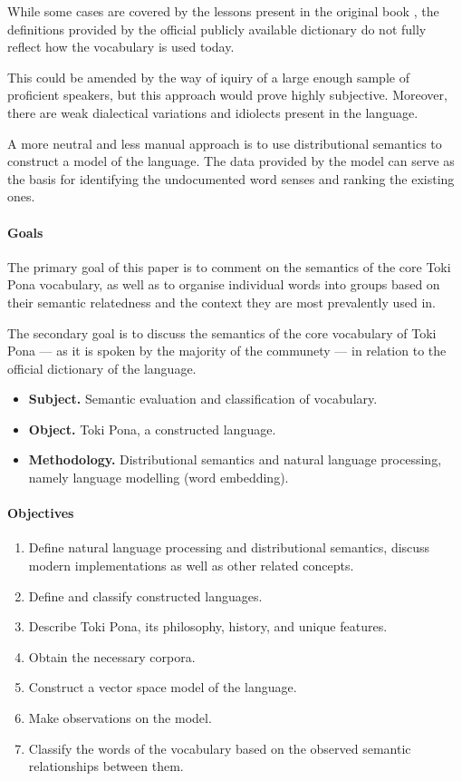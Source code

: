 \documentclass[14pt, a4paper]{extreport}
\begin{document}
While some cases are covered by the lessons present in the original book \parencite{pu}, the definitions provided by the official publicly available dictionary do not fully reflect how the vocabulary is used today.

This could be amended by the way of iquiry of a large enough sample of proficient speakers, but this approach would prove highly subjective. Moreover, there are weak dialectical variations and idiolects present in the language.

A more neutral and less manual approach is to use distributional semantics to construct a model of the language. The data provided by the model can serve as the basis for identifying the undocumented word senses and ranking the existing ones.

\paragraph{Goals}

The primary goal of this paper is to comment on the semantics of the core Toki Pona vocabulary, as well as to organise individual words into groups based on their semantic relatedness and the context they are most prevalently used in.

The secondary goal is to discuss the semantics of the core vocabulary of Toki Pona --- as it is spoken by the majority of the communety --- in relation to the official dictionary of the language.

\begin{itemize}
  \item \textbf{Subject.} Semantic evaluation and classification of vocabulary.
  \item \textbf{Object.} Toki Pona, a constructed language.
  \item \textbf{Methodology.} Distributional semantics and natural language processing, namely language modelling (word embedding).
\end{itemize}


\paragraph{Objectives}

\begin{enumerate}
  \item Define natural language processing and distributional semantics, discuss modern implementations as well as other related concepts.
  \item Define and classify constructed languages.
  \item Describe Toki Pona, its philosophy, history, and unique features.
  \item Obtain the necessary corpora.
  \item Construct a vector space model of the language.
  \item Make observations on the model.
  \item Classify the words of the vocabulary based on the observed semantic relationships between them.
\end{enumerate}
\end{document}
